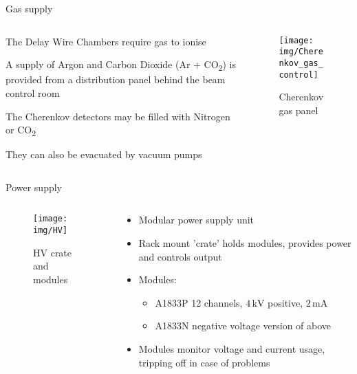 \documentclass[9pt]{beamer}
\begin{document}
\begin{frame}{Gas supply}
  \begin{columns}
    \begin{column}{.6\textwidth}
    The Delay Wire Chambers require gas to ionise
    \vspace{0.5cm}

    A supply of Argon and Carbon Dioxide (Ar + CO\textsubscript{2}) is provided from a distribution panel behind the beam control room
    \vspace{0.5cm}

    The Cherenkov detectors may be filled with Nitrogen or CO\textsubscript{2}
    \vspace{0.5cm}

    They can also be evacuated by vacuum pumps
    \end{column}
    \begin{column}{.4\textwidth}
    \vspace*{-0.5cm}
    \begin{figure}\texttt{[image: img/Cherenkov\_gas\_control]}\vspace*{-0.2cm}\caption{Cherenkov gas panel}\end{figure}\vspace*{-1cm}
    \end{column}
  \end{columns}
\end{frame}

\begin{frame}{Power supply}
  \begin{columns}
    \begin{column}{.6\textwidth}
    \vspace*{-0.5cm}
    \begin{figure}\texttt{[image: img/HV]}\vspace*{-0.2cm}\caption{HV crate and modules}\end{figure}\vspace*{-1cm}
    \end{column}
    \begin{column}{.4\textwidth}
    \vspace*{-0.5cm}
    \begin{itemize}
        \item Modular power supply unit
        \item Rack mount 'crate' holds modules, provides power and controls output
        \item Modules:
        \begin{itemize}
            \item A1833P 12 channels, $4\,\mathrm{kV}$ positive, $2\,\mathrm{mA}$
            \item A1833N negative voltage version of above
        \end{itemize}
        \item Modules monitor voltage and current usage, tripping off in case of problems
    \end{itemize}
    \end{column}
  \end{columns}
\end{frame}
\end{document}

